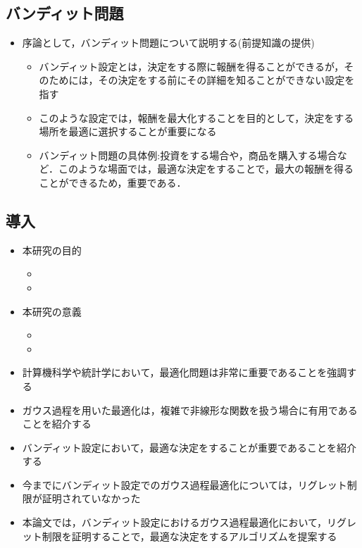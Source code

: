 \documentclass[dvipdfmx, 10.5pt]{beamer}
\begin{document}
\subsection{バンディット問題}
\begin{frame}{\insertsubsection}
	\begin{itemize}
		\item 序論として，バンディット問題について説明する(前提知識の提供)
		\begin{itemize}
			\item バンディット設定とは，決定をする際に報酬を得ることができるが，そのためには，その決定をする前にその詳細を知ることができない設定を指す
			\item このような設定では，報酬を最大化することを目的として，決定をする場所を最適に選択することが重要になる
			\item バンディット問題の具体例:投資をする場合や，商品を購入する場合など．このような場面では，最適な決定をすることで，最大の報酬を得ることができるため，重要である．
		\end{itemize}
	\end{itemize}
\end{frame}


\subsection{導入}

\begin{frame}{\insertsubsection}
	\begin{itemize}
		\item 本研究の目的
		\begin{itemize}
			\item 
			\item 
		\end{itemize}
		\item 本研究の意義
		\begin{itemize}
			\item 
			\item 
		\end{itemize}
	\end{itemize}

	\begin{itemize}
		\item 計算機科学や統計学において，最適化問題は非常に重要であることを強調する
		\item ガウス過程を用いた最適化は，複雑で非線形な関数を扱う場合に有用であることを紹介する
		\item バンディット設定において，最適な決定をすることが重要であることを紹介する
		\item 今までにバンディット設定でのガウス過程最適化については，リグレット制限が証明されていなかった
		\item 本論文では，バンディット設定におけるガウス過程最適化において，リグレット制限を証明することで，最適な決定をするアルゴリズムを提案する
	\end{itemize}

\end{frame}
\end{document}
